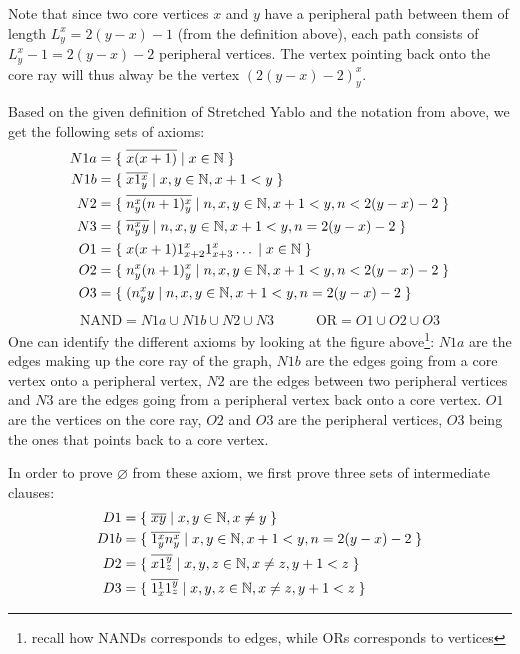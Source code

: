 Note that since two core vertices $x$ and $y$ have a peripheral path between them of length $L^x_y = 2(y-x) - 1$ (from the definition above), each path consists of $L^x_y - 1 = 2(y-x) - 2$ peripheral vertices.
The vertex pointing back onto the core ray will thus alway be the vertex $(2(y-x)-2)^x_y$.

Based on the given definition of Stretched Yablo and the notation from above, we get the following sets of axioms:
\begin{align}
  N1a &= \{\; \overline{x(x+1)} \;|\; x \in \mathbb{N} \; \} \\
	N1b &= \{\; \overline{x1^x_y} \;|\; x,y \in \mathbb{N}, x+1 < y \; \} \\
	N2 &= \{\; \overline{n^x_y(n+1)^x_y} \;|\; n,x,y \in \mathbb{N}, x+1 < y, n < 2(y-x) - 2 \; \} \\
	N3 &= \{\; \overline{n^x_yy} \;|\; n,x,y \in \mathbb{N}, x+1 < y, n = 2(y-x)-2 \; \} \\
	O1 &= \{\; x(x+1)1^x_{x+2}1^x_{x+3}\dots \;|\; x \in \mathbb{N} \; \} \\
  O2 &= \{\; n^x_y(n+1)^x_y \;|\; n,x,y \in \mathbb{N}, x+1 < y, n < 2(y-x) - 2 \; \} \\
	O3 &= \{\; (n^x_yy \;|\; n,x,y \in \mathbb{N}, x+1 < y, n = 2(y-x)-2 \; \}
\end{align}
\begin{align}
  \text{NAND} = N1a \cup N1b \cup N2 \cup N3 \quad\quad\quad \text{OR} = O1 \cup O2 \cup O3
\end{align}
One can identify the different axioms by looking at the figure above\footnote{recall how NANDs corresponds to edges, while ORs corresponds to vertices}:
$N1a$ are the edges making up the core ray of the graph, $N1b$ are the edges going from a core vertex onto a peripheral vertex, $N2$ are the edges between two peripheral vertices and $N3$ are the edges going from a peripheral vertex back onto a core vertex.
$O1$ are the vertices on the core ray, $O2$ and $O3$ are the peripheral vertices, $O3$ being the ones that points back to a core vertex.

In order to prove $\varnothing$ from these axiom, we first prove three sets of intermediate clauses:
\begin{align}
  D1 &= \{\; \overline{xy} \;|\; x,y \in \mathbb{N}, x \neq y \; \} \\
  D1b &= \{\; \overline{1^x_yn^x_y} \;|\; x,y \in \mathbb{N}, x+1 < y, n = 2(y-x)-2 \; \} \\
  D2 &= \{\; \overline{x1^y_z} \;|\; x,y,z \in \mathbb{N}, x \neq z, y+1 < z \; \} \\
  D3 &= \{\; \overline{1^1_x1^y_z} \;|\; x,y,z \in \mathbb{N}, x \neq z, y+1 < z \; \}
\end{align}
